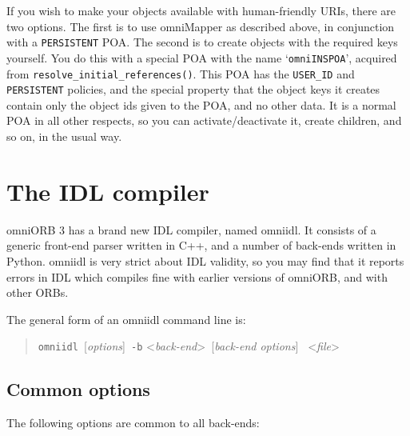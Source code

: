 \documentclass[11pt,twoside,a4paper]{book}
\newcommand{\code}[1]{\texttt{#1}}
\newcommand{\op}[1]{\texttt{#1()}}
\newcommand{\cmdline}[1]{\texttt{#1}}
\begin{document}
If you wish to make your objects available with human-friendly URIs,
there are two options. The first is to use omniMapper as described
above, in conjunction with a \code{PERSISTENT} POA. The second is to
create objects with the required keys yourself. You do this with a
special POA with the name `\texttt{omniINSPOA}', acquired from
\op{resolve\_initial\_references}. This POA has the \code{USER\_ID}
and \code{PERSISTENT} policies, and the special property that the
object keys it creates contain only the object ids given to the POA,
and no other data. It is a normal POA in all other respects, so you
can activate/deactivate it, create children, and so on, in the usual
way.





\chapter{The IDL compiler}
\label{chap:omniidl}

omniORB 3 has a brand new IDL compiler, named omniidl. It consists of
a generic front-end parser written in C++, and a number of back-ends
written in Python. omniidl is very strict about IDL validity, so you
may find that it reports errors in IDL which compiles fine with
earlier versions of omniORB, and with other ORBs.

The general form of an omniidl command line is:

\begin{quote} %
\cmdline{omniidl }[\textit{options}]\cmdline{ -b}%
<\textit{back-end}>\cmdline{ }[\textit{back-end options}]%
\cmdline{ }<\textit{file}>
\end{quote}

\section{Common options}

The following options are common to all back-ends:
\end{document}
